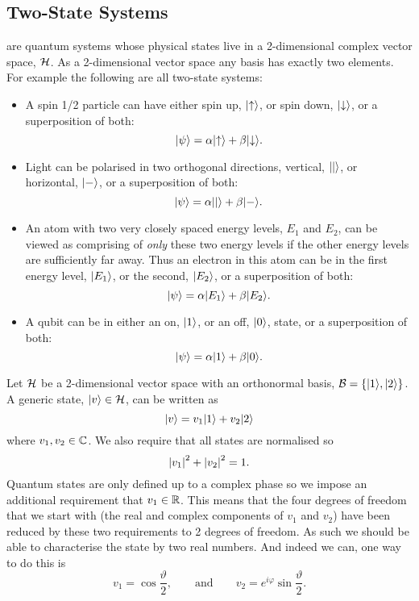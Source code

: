     \subsection{Two-State Systems}
     are quantum systems whose physical states live in a 2-dimensional complex vector space, \(\mathcal{H}\).
    As a 2-dimensional vector space any basis has exactly two elements.
    For example the following are all two-state systems:
    \begin{itemize}
        \item A spin 1/2 particle can have either spin up, \(\vert {\uparrow} \rangle\), or spin down, \(\vert {\downarrow} \rangle\), or a superposition of both:
        \[\vert {\psi} \rangle = \alpha\vert {\uparrow} \rangle + \beta\vert {\downarrow} \rangle.\]
        \item Light can be polarised in two orthogonal directions, vertical, \(\vert {|} \rangle\), or horizontal, \(\vert {-} \rangle\), or a superposition of both:
        \[\vert {\psi} \rangle = \alpha\vert {|} \rangle + \beta\vert {-} \rangle.\]
        \item An atom with two very closely spaced energy levels, \(E_1\) and \(E_2\), can be viewed as comprising of \emph{only} these two energy levels if the other energy levels are sufficiently far away.
        Thus an electron in this atom can be in the first energy level, \(\vert {E_1} \rangle\), or the second, \(\vert {E_2} \rangle\), or a superposition of both:
        \[\vert {\psi} \rangle = \alpha\vert {E_1} \rangle + \beta\vert {E_2} \rangle.\]
        \item A qubit can be in either an on, \(\vert {1} \rangle\), or an off, \(\vert {0} \rangle\), state, or a superposition of both:
        \[\vert {\psi} \rangle = \alpha\vert {1} \rangle + \beta\vert {0} \rangle.\]
    \end{itemize}
    Let \(\mathcal{H}\) be a 2-dimensional vector space with an orthonormal basis, \(\mathcal{B} = \{\vert {1} \rangle, \vert {2} \rangle\}\).
    A generic state, \(\vert {v} \rangle\in\mathcal{H}\), can be written as
    \[\vert {v} \rangle = v_1\vert {1} \rangle + v_2\vert {2} \rangle\]
    where \(v_1, v_2\in\mathbb{C}\).
    We also require that all states are normalised so
    \[\abs{v_1}^2 + \abs{v_2}^2 = 1.\]
    Quantum states are only defined up to a complex phase so we impose an additional requirement that \(v_1\in\mathbb{R}\).
    This means that the four degrees of freedom that we start with (the real and complex components of \(v_1\) and \(v_2\)) have been reduced by these two requirements to 2 degrees of freedom.
    As such we should be able to characterise the state by two real numbers.
    And indeed we can, one way to do this is
    \[v_1 = \cos\frac{\vartheta}{2},\qquad\text{and}\qquad v_2 = e^{i\varphi}\sin\frac{\vartheta}{2}.\]
